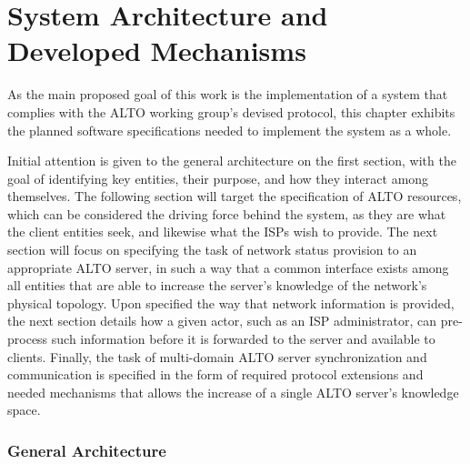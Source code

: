 \chapter{System Architecture and Developed Mechanisms}

    As the main proposed goal of this work is the implementation of a system that complies with the ALTO working group's devised protocol, this chapter exhibits the planned software specifications needed to implement the system as a whole.

    Initial attention is given to the general architecture on the first section, with the goal of identifying key entities, their purpose, and how they interact among themselves.
    The following section will target the specification of ALTO resources, which can be considered the driving force behind the system, as they are what the client entities seek, and likewise what the ISPs wish to provide.
    The next section will focus on specifying the task of network status provision to an appropriate ALTO server, in such a way that a common interface exists among all entities that are able to increase the server's knowledge of the network's physical topology.
    Upon specified the way that network information is provided, the next section details how a given actor, such as an ISP administrator, can pre-process such information before it is forwarded to the server and available to clients.
    Finally, the task of multi-domain ALTO server synchronization and communication is specified in the form of required protocol extensions and needed mechanisms that allows the increase of a single ALTO server's knowledge space.

\subsection{General Architecture}

